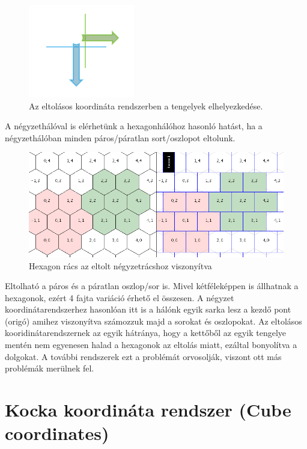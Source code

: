 \begin{figure}[h]
\centering
\includegraphics[scale=0.5]{kepek/img41.png}
\caption{Az eltolásos koordináta rendszerben a tengelyek elhelyezkedése.}
\label{fig:img41}
\end{figure}

\noindent A négyzethálóval is elérhetünk a hexagonhálóhoz hasonló hatást, ha a négyzethálóban minden páros/páratlan sort/oszlopot eltolunk.

\begin{figure}[h]
\centering
\includegraphics[scale=0.5]{kepek/img42.png}
\caption{Hexagon rács az eltolt négyzetrácshoz viszonyítva}
\label{fig:img42}
\end{figure}

Eltolható a páros és a páratlan oszlop/sor is. Mivel kétféleképpen is állhatnak a hexagonok, ezért 4 fajta variáció érhető el összesen.
\newline
\newline A négyzet koordinátarendszerhez hasonlóan itt is a hálónk egyik sarka lesz a kezdő pont (origó) amihez viszonyítva számozzuk majd a sorokat és oszlopokat.
\newline
\newline Az eltolásos kooridinátarendszernek az egyik hátránya, hogy a kettőből az egyik tengelye mentén nem egyenesen halad a hexagonok az eltolás miatt, ezáltal bonyolítva a dolgokat. A további rendszerek ezt a problémát orvosolják, viszont ott más problémák merülnek fel.		

\section{Kocka koordináta rendszer (Cube coordinates)}

